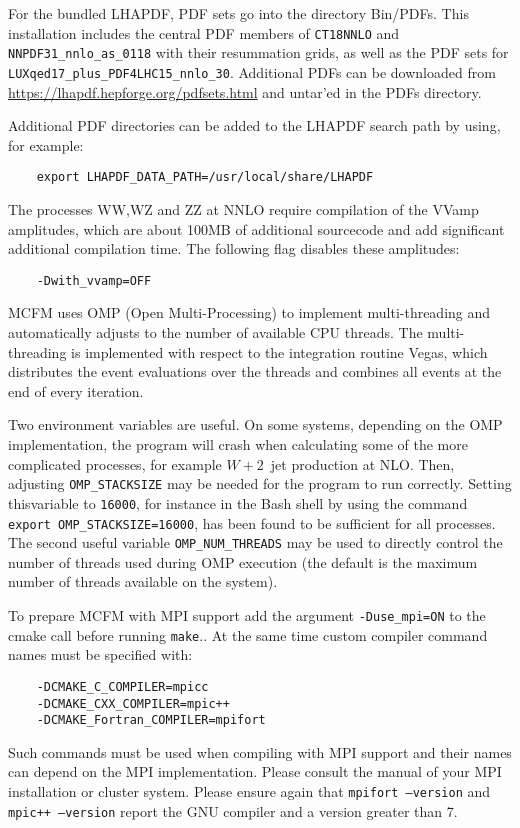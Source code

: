 For the bundled LHAPDF, PDF sets go into the directory Bin/PDFs. This
 installation includes the central PDF members of \texttt{CT18NNLO} and
 \texttt{NNPDF31\_nnlo\_as\_0118} with their resummation grids,
 as well as the PDF sets for \texttt{LUXqed17\_plus\_PDF4LHC15\_nnlo\_30}. Additional PDFs
 can be downloaded from \url{https://lhapdf.hepforge.org/pdfsets.html} and
 untar'ed in the PDFs directory.
 
 Additional PDF directories can be added to the LHAPDF search path by
 using, for example:
 \begin{verbatim}
 	export LHAPDF_DATA_PATH=/usr/local/share/LHAPDF
 \end{verbatim} 
 
 \hypertarget{ww-wz-and-zz-with-vvamp}{%
 	\label{ww-wz-and-zz-with-vvamp}}
 
 The processes WW,WZ and ZZ at NNLO require compilation of the VVamp
 amplitudes, which are about 100MB of additional sourcecode and add
 significant additional compilation time. The following flag disables
 these amplitudes: 
 \begin{verbatim}
 	-Dwith_vvamp=OFF
 \end{verbatim}
 
 \hypertarget{openmp-and-mpi}{%
 	\label{openmp-and-mpi}}
 
 MCFM uses OMP (Open Multi-Processing) to implement multi-threading and
 automatically adjusts to the number of available CPU threads. The
 multi-threading is implemented with respect to the integration routine
 Vegas, which distributes the event evaluations over the threads and
 combines all events at the end of every iteration.
 
 Two environment variables are useful. On some systems, depending on the
 OMP implementation, the program will crash when calculating some of the
 more complicated processes, for example \(W+2\)~jet production at NLO.
 Then, adjusting \texttt{OMP\_STACKSIZE} may be needed for the program to
 run correctly. Setting thisvariable to \texttt{16000}, for instance in
 the Bash shell by using the command
 \texttt{export\ OMP\_STACKSIZE=16000}, has been found to be sufficient
 for all processes. The second useful variable \texttt{OMP\_NUM\_THREADS}
 may be used to directly control the number of threads used during OMP
 execution (the default is the maximum number of threads available on the
 system).
 
 To prepare MCFM with MPI support add the argument
 \texttt{-Duse\_mpi=ON} to the cmake call before running
 \texttt{make}.. At the same time custom compiler command names must be
 specified with:
 \begin{verbatim}
 	-DCMAKE_C_COMPILER=mpicc
 	-DCMAKE_CXX_COMPILER=mpic++
 	-DCMAKE_Fortran_COMPILER=mpifort
 \end{verbatim}
 Such commands must be used when
 compiling with MPI support and their names can depend on the MPI
 implementation. Please consult the manual of your MPI installation or
 cluster system. Please ensure again that \texttt{mpifort\ --version}
 and \texttt{mpic++\ --version} report the GNU compiler and a version
 greater than 7.
 

